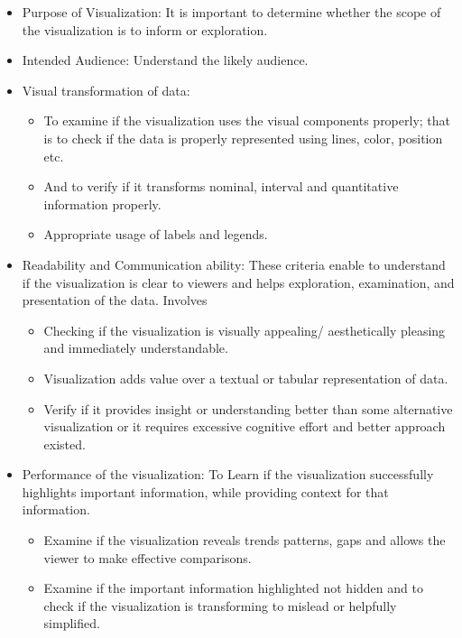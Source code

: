 \documentclass[]{book}
\providecommand{\tightlist}{%
  \setlength{\itemsep}{0pt}\setlength{\parskip}{0pt}}
\begin{document}
\begin{itemize}
\tightlist
\item
  Purpose of Visualization: It is important to determine whether the scope of the visualization is to inform or exploration.
\item
  Intended Audience: Understand the likely audience.
\item
  Visual transformation of data:

  \begin{itemize}
  \item
    To examine if the visualization uses the visual components properly; that is to check if the data is properly represented using lines, color, position etc.
  \item
    And to verify if it transforms nominal, interval and quantitative information properly.
  \item
    Appropriate usage of labels and legends.
  \end{itemize}
\item
  Readability and Communication ability: These criteria enable to understand if the visualization is clear to viewers and helps exploration, examination, and presentation of the data. Involves

  \begin{itemize}
  \tightlist
  \item
    Checking if the visualization is visually appealing/ aesthetically pleasing and immediately understandable.
  \item
    Visualization adds value over a textual or tabular representation of data.
  \item
    Verify if it provides insight or understanding better than some alternative visualization or it requires excessive cognitive effort and better approach existed.
  \end{itemize}
\item
  Performance of the visualization: To Learn if the visualization successfully highlights important information, while providing context for that information.

  \begin{itemize}
  \tightlist
  \item
    Examine if the visualization reveals trends patterns, gaps and allows the viewer to make effective comparisons.
  \item
    Examine if the important information highlighted not hidden and to check if the visualization is transforming to mislead or helpfully simplified.
  \end{itemize}
\end{itemize}
\end{document}
